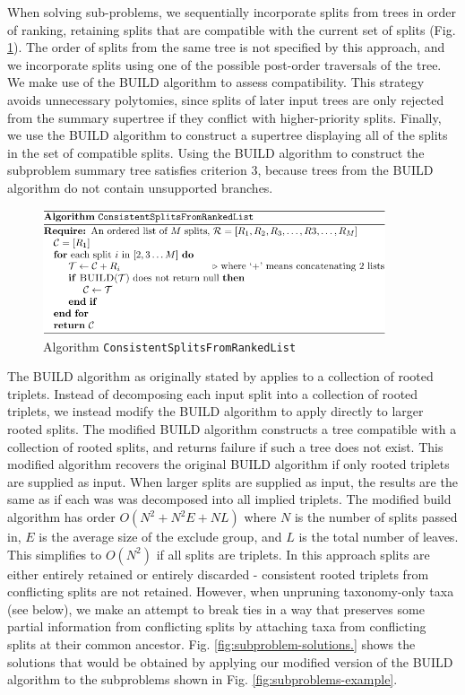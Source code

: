 \documentclass[fleqn,12pt,lineno,english]{wlpeerj}
\begin{document}
When solving sub-problems, we sequentially incorporate splits from
trees in order of ranking, retaining splits that are compatible with
the current set of splits (Fig. \ref{alg:ConsistentSplitsFromRankedList}).
The order of splits from the same tree is not specified by this approach,
and we incorporate splits using one of the possible post-order traversals
of the tree. We make use of the BUILD algorithm \citep{AhoSSU1981}
to assess compatibility. This strategy avoids unnecessary polytomies,
since splits of later input trees are only rejected from the summary
supertree if they conflict with higher-priority splits. Finally, we
use the BUILD algorithm to construct a supertree displaying all of
the splits in the set of compatible splits. Using the BUILD algorithm
to construct the subproblem summary tree satisfies criterion 3, because
trees from the BUILD algorithm do not contain unsupported branches.
\begin{figure}
\includegraphics[width=0.9\textwidth]{fig8}
\caption{\label{alg:ConsistentSplitsFromRankedList}Algorithm \texttt{ConsistentSplitsFromRankedList}}
\end{figure}

The BUILD algorithm as originally stated by \citet{AhoSSU1981} applies
to a collection of rooted triplets. Instead of decomposing each input
split into a collection of rooted triplets, we instead modify the
BUILD algorithm to apply directly to larger rooted splits. The modified
BUILD algorithm constructs a tree compatible with a collection of
rooted splits, and returns failure if such a tree does not exist.
This modified algorithm recovers the original BUILD algorithm if only
rooted triplets are supplied as input. When larger splits are supplied
as input, the results are the same as if each was was decomposed into
all implied triplets. The modified build algorithm has order $O(N^{2}+N^{2}E+NL)$
where $N$ is the number of splits passed in, $E$ is the average
size of the exclude group, and $L$ is the total number of leaves.
This simplifies to $O(N^{2})$ if all splits are triplets. In this
approach splits are either entirely retained or entirely discarded
- consistent rooted triplets from conflicting splits are not retained.
However, when unpruning taxonomy-only taxa (see below), we make an
attempt to break ties in a way that preserves some partial information
from conflicting splits by attaching taxa from conflicting splits
at their common ancestor. Fig. \ref{fig:subproblem-solutions.}
shows the solutions that would be obtained by applying our modified
version of the BUILD algorithm to the subproblems shown in Fig. \ref{fig:subproblems-example}.
\end{document}
